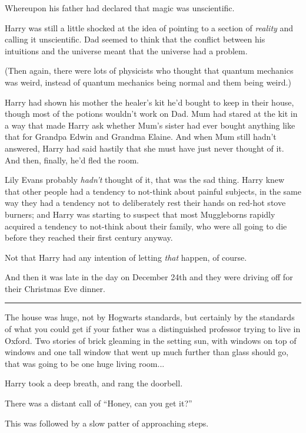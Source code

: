 Whereupon his father had declared that magic was unscientific.

Harry was still a little shocked at the idea of pointing to a section of
\emph{reality} and calling it unscientific. Dad seemed to think that the
conflict between his intuitions and the universe meant that the universe
had a problem.

(Then again, there were lots of physicists who thought that quantum
mechanics was weird, instead of quantum mechanics being normal and them
being weird.)

Harry had shown his mother the healer's kit he'd bought to keep in their
house, though most of the potions wouldn't work on Dad. Mum had stared
at the kit in a way that made Harry ask whether Mum's sister had ever
bought anything like that for Grandpa Edwin and Grandma Elaine. And when
Mum still hadn't answered, Harry had said hastily that she must have
just never thought of it. And then, finally, he'd fled the room.

Lily Evans probably \emph{hadn't} thought of it, that was the sad thing.
Harry knew that other people had a tendency to not-think about painful
subjects, in the same way they had a tendency not to deliberately rest
their hands on red-hot stove burners; and Harry was starting to suspect
that most Muggleborns rapidly acquired a tendency to not-think about
their family, who were all going to die before they reached their first
century anyway.

Not that Harry had any intention of letting \emph{that} happen, of
course.

And then it was late in the day on December 24th and they were driving
off for their Christmas Eve dinner.

\begin{center}\rule{3in}{0.4pt}\end{center}

The house was huge, not by Hogwarts standards, but certainly by the
standards of what you could get if your father was a distinguished
professor trying to live in Oxford. Two stories of brick gleaming in the
setting sun, with windows on top of windows and one tall window that
went up much further than glass should go, that was going to be one huge
living room...

Harry took a deep breath, and rang the doorbell.

There was a distant call of ``Honey, can you get it?''

This was followed by a slow patter of approaching steps.

